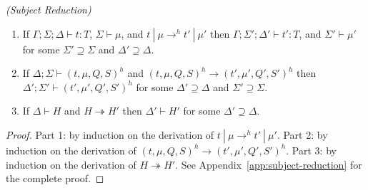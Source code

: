 \begin{thm}
\emph{(Subject Reduction)}\label{th:subject-reduction}

\begin{enumerate}

\item If $\Gamma ; \Sigma ; \Delta \vdash t : T$, $\Sigma \vdash \mu$, and $t~|~\mu \rightarrow^h t'~|~\mu'$ then $\Gamma ; \Sigma' ; \Delta' \vdash t' : T$, and $\Sigma' \vdash \mu'$ for some $\Sigma' \supseteq \Sigma$ and $\Delta' \supseteq \Delta$.

\item If $\Delta ; \Sigma \vdash (t, \mu, Q, S)^h$ and $(t, \mu, Q, S)^h \longrightarrow (t', \mu', Q', S')^h$ then $\Delta' ; \Sigma' \vdash (t', \mu', Q', S')^h$ for some $\Delta' \supseteq \Delta$ and $\Sigma' \supseteq \Sigma$.

\item If $\Delta \vdash H$ and $H \twoheadrightarrow H'$ then $\Delta' \vdash H'$ for some $\Delta' \supseteq \Delta$.

\end{enumerate}

\end{thm}
\begin{proof}
  Part 1: by induction on the derivation of $t~|~\mu \rightarrow^h
  t'~|~\mu'$. Part 2: by induction on the derivation of $(t, \mu, Q,
  S)^h \longrightarrow (t', \mu', Q', S')^h$. Part 3: by induction on
  the derivation of $H \twoheadrightarrow H'$. See
  Appendix~\ref{app:subject-reduction} for the complete proof.
\end{proof}



